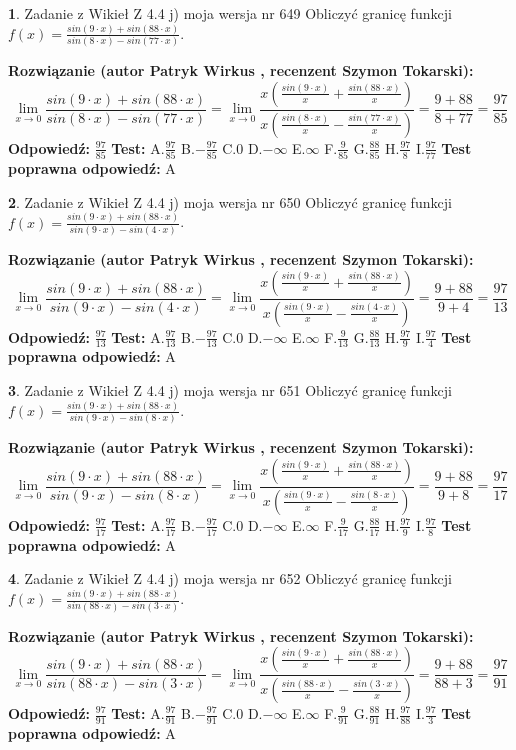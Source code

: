\documentclass[12pt, a4paper]{article}
\theoremstyle{definition} %
\newtheorem{zad}{}
\newcommand{\zadStart}[1]{\begin{zad}#1\newline}
\newcommand{\zadStop}{\end{zad}}
\newcommand{\rozwStart}[2]{\noindent \textbf{Rozwiązanie (autor #1 , recenzent #2): }\newline}
\newcommand{\rozwStop}{\newline}
\newcommand{\odpStart}{\noindent \textbf{Odpowiedź:}\newline}
\newcommand{\odpStop}{\newline}
\newcommand{\testStart}{\noindent \textbf{Test:}\newline}
\newcommand{\testStop}{\newline}
\newcommand{\kluczStart}{\noindent \textbf{Test poprawna odpowiedź:}\newline}
\newcommand{\kluczStop}{\newline}
\begin{document}
\zadStart{Zadanie z Wikieł Z 4.4 j) moja wersja nr 649}
Obliczyć granicę funkcji $f(x)=\frac{sin(9\cdot x) +sin(88\cdot x)}{sin(8\cdot x) -sin(77\cdot x)}$.
\zadStop
\rozwStart{Patryk Wirkus}{Szymon Tokarski}
$$\lim\limits_{x\to 0}\frac{sin(9\cdot x) +sin(88\cdot x)}{sin(8\cdot x) -sin(77\cdot x)}=\lim\limits_{x\to 0}\frac{x(\frac{sin(9\cdot x)}{x}+\frac{sin(88\cdot x)}{x})}{x(\frac{sin(8\cdot x)}{x}-\frac{sin(77\cdot x)}{x})}=\frac{9+88}{8+77} = \frac{97}{85}$$
\rozwStop
\odpStart
$\frac{97}{85}$
\odpStop
\testStart
A.$\frac{97}{85}$
B.$-\frac{97}{85}$
C.$0$
D.$-\infty$
E.$\infty$
F.$\frac{9}{85}$
G.$\frac{88}{85}$
H.$\frac{97}{8}$
I.$\frac{97}{77}$
\testStop
\kluczStart
A
\kluczStop



\zadStart{Zadanie z Wikieł Z 4.4 j) moja wersja nr 650}
Obliczyć granicę funkcji $f(x)=\frac{sin(9\cdot x) +sin(88\cdot x)}{sin(9\cdot x) -sin(4\cdot x)}$.
\zadStop
\rozwStart{Patryk Wirkus}{Szymon Tokarski}
$$\lim\limits_{x\to 0}\frac{sin(9\cdot x) +sin(88\cdot x)}{sin(9\cdot x) -sin(4\cdot x)}=\lim\limits_{x\to 0}\frac{x(\frac{sin(9\cdot x)}{x}+\frac{sin(88\cdot x)}{x})}{x(\frac{sin(9\cdot x)}{x}-\frac{sin(4\cdot x)}{x})}=\frac{9+88}{9+4} = \frac{97}{13}$$
\rozwStop
\odpStart
$\frac{97}{13}$
\odpStop
\testStart
A.$\frac{97}{13}$
B.$-\frac{97}{13}$
C.$0$
D.$-\infty$
E.$\infty$
F.$\frac{9}{13}$
G.$\frac{88}{13}$
H.$\frac{97}{9}$
I.$\frac{97}{4}$
\testStop
\kluczStart
A
\kluczStop



\zadStart{Zadanie z Wikieł Z 4.4 j) moja wersja nr 651}
Obliczyć granicę funkcji $f(x)=\frac{sin(9\cdot x) +sin(88\cdot x)}{sin(9\cdot x) -sin(8\cdot x)}$.
\zadStop
\rozwStart{Patryk Wirkus}{Szymon Tokarski}
$$\lim\limits_{x\to 0}\frac{sin(9\cdot x) +sin(88\cdot x)}{sin(9\cdot x) -sin(8\cdot x)}=\lim\limits_{x\to 0}\frac{x(\frac{sin(9\cdot x)}{x}+\frac{sin(88\cdot x)}{x})}{x(\frac{sin(9\cdot x)}{x}-\frac{sin(8\cdot x)}{x})}=\frac{9+88}{9+8} = \frac{97}{17}$$
\rozwStop
\odpStart
$\frac{97}{17}$
\odpStop
\testStart
A.$\frac{97}{17}$
B.$-\frac{97}{17}$
C.$0$
D.$-\infty$
E.$\infty$
F.$\frac{9}{17}$
G.$\frac{88}{17}$
H.$\frac{97}{9}$
I.$\frac{97}{8}$
\testStop
\kluczStart
A
\kluczStop



\zadStart{Zadanie z Wikieł Z 4.4 j) moja wersja nr 652}
Obliczyć granicę funkcji $f(x)=\frac{sin(9\cdot x) +sin(88\cdot x)}{sin(88\cdot x) -sin(3\cdot x)}$.
\zadStop
\rozwStart{Patryk Wirkus}{Szymon Tokarski}
$$\lim\limits_{x\to 0}\frac{sin(9\cdot x) +sin(88\cdot x)}{sin(88\cdot x) -sin(3\cdot x)}=\lim\limits_{x\to 0}\frac{x(\frac{sin(9\cdot x)}{x}+\frac{sin(88\cdot x)}{x})}{x(\frac{sin(88\cdot x)}{x}-\frac{sin(3\cdot x)}{x})}=\frac{9+88}{88+3} = \frac{97}{91}$$
\rozwStop
\odpStart
$\frac{97}{91}$
\odpStop
\testStart
A.$\frac{97}{91}$
B.$-\frac{97}{91}$
C.$0$
D.$-\infty$
E.$\infty$
F.$\frac{9}{91}$
G.$\frac{88}{91}$
H.$\frac{97}{88}$
I.$\frac{97}{3}$
\testStop
\kluczStart
A
\kluczStop
\end{document}
